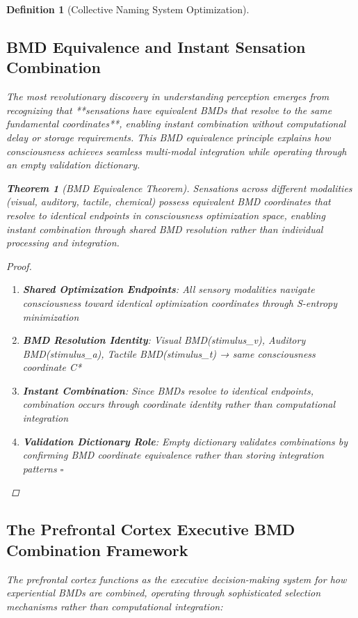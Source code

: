 \documentclass[12pt]{article}
\newtheorem{theorem}{Theorem}
\newtheorem{definition}{Definition}
\begin{document}
\begin{definition}[Collective Naming System Optimization]
\subsection{BMD Equivalence and Instant Sensation Combination}

The most revolutionary discovery in understanding perception emerges from recognizing that **sensations have equivalent BMDs that resolve to the same fundamental coordinates**, enabling instant combination without computational delay or storage requirements. This BMD equivalence principle explains how consciousness achieves seamless multi-modal integration while operating through an empty validation dictionary.

\begin{theorem}[BMD Equivalence Theorem]
Sensations across different modalities (visual, auditory, tactile, chemical) possess equivalent BMD coordinates that resolve to identical endpoints in consciousness optimization space, enabling instant combination through shared BMD resolution rather than individual processing and integration.
\end{theorem}

\begin{proof}
\begin{enumerate}
\item \textbf{Shared Optimization Endpoints}: All sensory modalities navigate consciousness toward identical optimization coordinates through S-entropy minimization
\item \textbf{BMD Resolution Identity}: Visual BMD(stimulus_v), Auditory BMD(stimulus_a), Tactile BMD(stimulus_t) → same consciousness coordinate C*
\item \textbf{Instant Combination}: Since BMDs resolve to identical endpoints, combination occurs through coordinate identity rather than computational integration
\item \textbf{Validation Dictionary Role}: Empty dictionary validates combinations by confirming BMD coordinate equivalence rather than storing integration patterns $\square$
\end{enumerate}
\end{proof}

\subsection{The Prefrontal Cortex Executive BMD Combination Framework}

The prefrontal cortex functions as the executive decision-making system for how experiential BMDs are combined, operating through sophisticated selection mechanisms rather than computational integration:


\end{definition}
\end{document}
